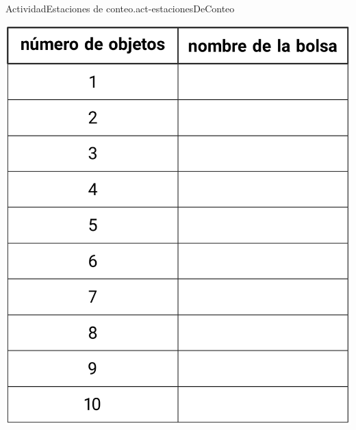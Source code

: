 \documentclass[20pt]{extarticle}
\begin{document}
\begin{activity}{Actividad}{Estaciones de conteo.}{act-estacionesDeConteo}%
\begin{image}{0}{1}{0}{}%
\includegraphics[max width=\linewidth, center]{external/tikz-source/act-estacionesDeConteo-tab.pdf}
\end{image}%
\end{activity}
\end{document}

